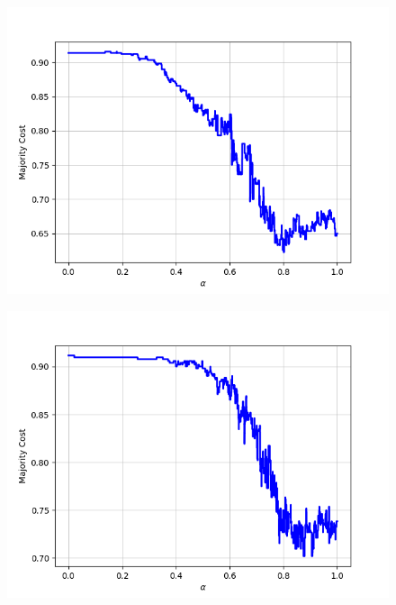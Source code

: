 \begin{figure}[H]
\centering
\begin{minipage}{.24\textwidth}
  \centering
  {\includegraphics[width=\linewidth]{plots/omniglot-intra-sc/Alphabet_of_the_Magi}}
\end{minipage}
\begin{minipage}{.24\textwidth}
  \centering
  {\includegraphics[width=\linewidth]{plots/omniglot-intra-sc/Anglo-Saxon_Futhorc}}
\end{minipage}
\begin{minipage}{.24\textwidth}
  \centering

\end{minipage}
\end{figure}
